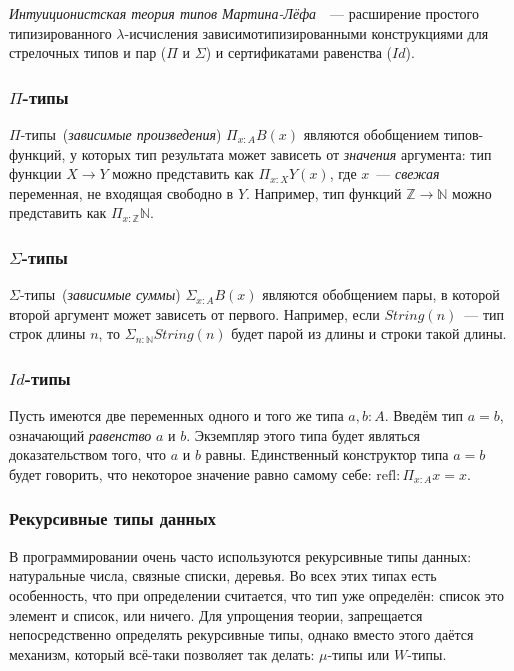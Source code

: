 \emph{Интуиционистская теория типов Мартина-Лёфа}~\cite{mltt}~---
расширение простого типизированного
$\lambda$-исчисления зависимотипизированными конструкциями
для стрелочных типов и пар ($\Pi$ и $\Sigma$) и сертификатами
равенства ($Id$).

\subsubsection{\texorpdfstring{$\Pi$}{Pi}-типы}

$\Pi$-типы~(\emph{зависимые произведения}) $\Pi_{x:A} B(x)$ являются
обобщением типов-функций, у которых тип результата может
зависеть от \emph{значения} аргумента: тип функции $X \to Y$ можно
представить как $\Pi_{x:X} Y(x)$, где $x$~--- \emph{свежая}
переменная, не входящая свободно в $Y$. Например, тип функций
$\mathbb{Z} \to \mathbb{N}$ можно представить как $\Pi_{x:\mathbb{Z}}
\mathbb{N}$.

\subsubsection{\texorpdfstring{$\Sigma$}{Sigma}-типы}

$\Sigma$-типы~(\emph{зависимые суммы}) $\Sigma_{x:A} B(x)$ являются
обобщением пары, в которой второй аргумент может зависеть от первого.
Например, если $String(n)$~--- тип строк длины $n$, то
$\Sigma_{n:\mathbb{N}} String(n)$ будет парой из длины и строки такой
длины.

\subsubsection{\texorpdfstring{$Id$}{Id}-типы}

Пусть имеются две переменных одного и того же типа $a, b : A$. Введём
тип $a = b$, означающий \emph{равенство} $a$ и $b$. Экземпляр этого
типа будет являться доказательством того, что $a$ и $b$ равны.
Единственный конструктор типа $a = b$ будет говорить, что некоторое
значение равно самому себе: $\mathrm{refl} : \Pi_{x:A} x = x$.

\subsubsection{Рекурсивные типы данных}

В программировании очень часто используются рекурсивные типы данных:
натуральные числа, связные списки, деревья. Во всех этих типах есть
особенность, что при определении считается, что тип уже определён:
список это элемент и список, или ничего. Для упрощения теории,
запрещается непосредственно определять рекурсивные типы, однако вместо
этого даётся механизм, который всё-таки позволяет так делать:
$\mu$-типы или $W$-типы.

